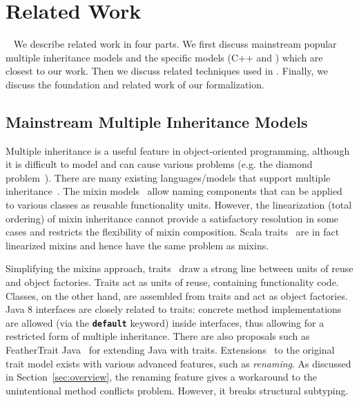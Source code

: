 \section{Related Work}~\label{sec:relatedwork}
We describe related work in four parts. We first discuss mainstream popular multiple 
inheritance models and the specific models (C++ and \csharp) which are closest to our work. Then we 
discuss related techniques used in \self. Finally, we discuss the foundation and related work of our formalization.

\subsection{Mainstream Multiple Inheritance Models}
Multiple inheritance is a useful feature in object-oriented
programming, although it is difficult to model and can 
cause various problems (e.g. the diamond problem~\cite{Sak89dis,Singh1995}).  
There are many existing languages/models that support multiple 
inheritance~\cite{ellis1990annotated,scala-overview,bracha90mixin,scharli03traits,malayeri2009cz,csharpdoc,Moon1986,Flatt1998,Ancona2003}. 
The mixin models~\cite{bracha90mixin,Flatt1998,van1996encapsulation,Ancona2003,Hendler86} allow naming components 
that can be applied to various classes as reusable functionality units. However, the linearization (total ordering) of mixin 
inheritance cannot provide a satisfactory resolution in some cases and restricts the flexibility of mixin composition. 
Scala traits~\cite{scala-overview} are in fact linearized mixins and hence have the same problem as mixins.

Simplifying the mixins approach, traits~\cite{scharli03traits,Ducasse:2006:TMF:1119479.1119483} draw a
strong line between units of reuse and object factories. Traits act
as units of reuse, containing functionality code. Classes, on the
other hand, are
assembled from traits and act as object factories. Java 8
interfaces are closely related to traits: concrete method
implementations are allowed (via the \textbf{\texttt{default}}
keyword) inside interfaces, thus allowing for a restricted form 
of multiple inheritance.
There are also proposals such as FeatherTrait Java~\cite{Liquori08ftj} 
for extending Java with traits. Extensions~\cite{reppy2006foundation,Reppy:2007:MT:2394758.2394784} to 
the original trait model exists with various advanced features, such as \emph{renaming}. As discussed in Section~\ref{sec:overview},
the renaming feature gives a workaround to the unintentional method conflicts
problem. However, it breaks structural subtyping.

